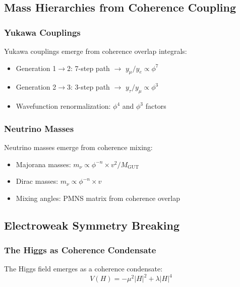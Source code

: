 \documentclass[11pt]{article}
\theoremstyle{definition}
\newcommand{\goldenratio}{\phi}
\begin{document}
\vspace{0.3cm}

\subsection{Mass Hierarchies from Coherence Coupling}

\subsubsection{Yukawa Couplings}

Yukawa couplings emerge from coherence overlap integrals:
\begin{itemize}
\item Generation 1$\to$2: 7-step path $\to$ $y_\mu/y_e \propto \goldenratio^7$
\item Generation 2$\to$3: 3-step path $\to$ $y_\tau/y_\mu \propto \goldenratio^3$
\item Wavefunction renormalization: $\goldenratio^4$ and $\goldenratio^3$ factors
\end{itemize}

\subsubsection{Neutrino Masses}

Neutrino masses emerge from coherence mixing:
\begin{itemize}
\item Majorana masses: $m_\nu \propto \goldenratio^{-n} \times v^2/M_{\text{GUT}}$
\item Dirac masses: $m_\nu \propto \goldenratio^{-n} \times v$
\item Mixing angles: PMNS matrix from coherence overlap
\end{itemize}

\subsection{Electroweak Symmetry Breaking}

\subsubsection{The Higgs as Coherence Condensate}

The Higgs field emerges as a coherence condensate:
\begin{equation}
V(H) = -\mu^2|H|^2 + \lambda|H|^4
\end{equation}
\end{document}
